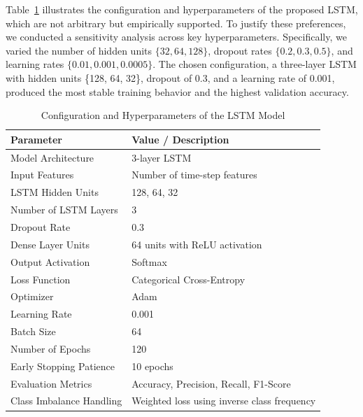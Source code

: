 \documentclass[conference]{IEEEtran}
\begin{document}


Table~\ref{tab:lstm_config} illustrates the configuration and hyperparameters of the proposed LSTM, which are not arbitrary but empirically supported. To justify these preferences, we conducted a sensitivity analysis across key hyperparameters. Specifically, we varied the number of hidden units $\{32, 64, 128\}$, dropout rates $\{0.2, 0.3, 0.5\}$, and learning rates $\{0.01, 0.001, 0.0005\}$. The chosen configuration, a three-layer LSTM with hidden units \{128, 64, 32\}, dropout of 0.3, and a learning rate of 0.001, produced the most stable training behavior and the highest validation accuracy. 

\begin{table}[ht]
\centering
\caption{Configuration and Hyperparameters of the LSTM Model}
\label{tab:lstm_config}
\begin{tabular}{|l|p{5cm}|}
\hline
\textbf{Parameter} & \textbf{Value / Description} \\
\hline
Model Architecture & 3-layer LSTM  \\
\hline
Input Features & Number of time-step features \\
\hline
LSTM Hidden Units & 128, 64, 32 \\
\hline
Number of LSTM Layers & 3 \\
\hline
Dropout Rate & 0.3 \\
\hline
Dense Layer Units & 64 units with ReLU activation \\
\hline
Output Activation & Softmax\\
\hline
Loss Function & Categorical Cross-Entropy \\
\hline
Optimizer & Adam \\
\hline
Learning Rate & 0.001 \\
\hline
Batch Size & 64 \\
\hline
Number of Epochs & 120 \\
\hline
Early Stopping Patience & 10 epochs\\
\hline
Evaluation Metrics & Accuracy, Precision, Recall, F1-Score \\
\hline
Class Imbalance Handling & Weighted loss using inverse class frequency \\
\hline
\end{tabular}
\end{table}
\end{document}
